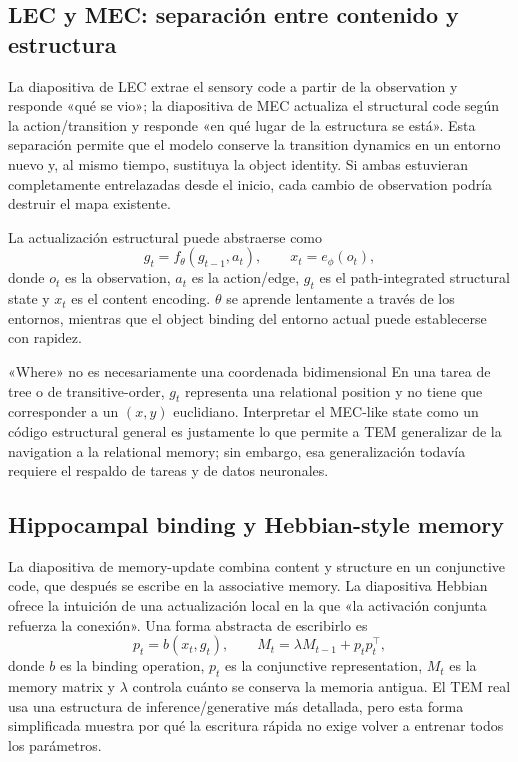 \subsection{LEC y MEC: separación entre contenido y estructura}

La diapositiva de LEC extrae el sensory code a partir de la observation y responde «qué se vio»; la diapositiva de MEC actualiza el structural code según la action/transition y responde «en qué lugar de la estructura se está». Esta separación permite que el modelo conserve la transition dynamics en un entorno nuevo y, al mismo tiempo, sustituya la object identity. Si ambas estuvieran completamente entrelazadas desde el inicio, cada cambio de observation podría destruir el mapa existente.



La actualización estructural puede abstraerse como
$$
g_t=f_{\theta}(g_{t-1},a_t),
\qquad
x_t=e_{\phi}(o_t),
$$
donde $o_t$ es la observation, $a_t$ es la action/edge, $g_t$ es el path-integrated structural state y $x_t$ es el content encoding. $\theta$ se aprende lentamente a través de los entornos, mientras que el object binding del entorno actual puede establecerse con rapidez.

\begin{warningbox}{«Where» no es necesariamente una coordenada bidimensional}
En una tarea de tree o de transitive-order, $g_t$ representa una relational position y no tiene que corresponder a un $(x,y)$ euclidiano. Interpretar el MEC-like state como un código estructural general es justamente lo que permite a TEM generalizar de la navigation a la relational memory; sin embargo, esa generalización todavía requiere el respaldo de tareas y de datos neuronales.
\end{warningbox}

\subsection{Hippocampal binding y Hebbian-style memory}

La diapositiva de memory-update combina content y structure en un conjunctive code, que después se escribe en la associative memory. La diapositiva Hebbian ofrece la intuición de una actualización local en la que «la activación conjunta refuerza la conexión». Una forma abstracta de escribirlo es
$$
p_t=b(x_t,g_t),
\qquad
M_t=\lambda M_{t-1}+p_t p_t^{\top},
$$
donde $b$ es la binding operation, $p_t$ es la conjunctive representation, $M_t$ es la memory matrix y $\lambda$ controla cuánto se conserva la memoria antigua. El TEM real usa una estructura de inference/generative más detallada, pero esta forma simplificada muestra por qué la escritura rápida no exige volver a entrenar todos los parámetros.

